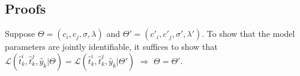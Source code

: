 \documentclass[mnsc]{informs3}
\begin{document}
\begin{APPENDICES}
\section{Proofs}

Suppose $\Theta = (c_i, c_j, \sigma, \lambda)$ and $\Theta' = (c'_i, c'_j, \sigma', \lambda')$. 
To show that the model parameters are jointly identifiable, it suffices to show that $\mathcal{L}(\hat{t}^i_k, \hat{t}^j_k, \hat{y}_k | \Theta) = \mathcal{L}(\hat{t}^i_k, \hat{t}^j_k, \hat{y}_k | \Theta')$ $\Rightarrow$ $\Theta = \Theta'$. 
\Halmos
\endproof





\end{APPENDICES}










%



\end{document}
